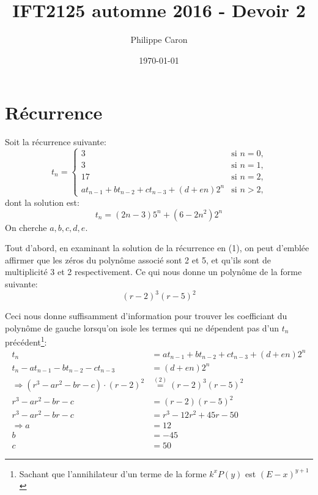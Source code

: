 \documentclass{article}
\title{\vspace{7cm}IFT2125 automne 2016 - Devoir 2} %
\author{Philippe Caron}
\date{\today}
\begin{document}
\maketitle

\pagebreak

\section{Récurrence}
Soit la récurrence suivante:
$$
t_n =
\begin{cases}
  3 & \text{si } n = 0 \text{,}\\
  3 & \text{si } n = 1 \text{,}\\
  17 & \text{si } n = 2 \text{,}\\
  at_{n-1} + bt_{n-2} + ct_{n-3} + (d + en)2^n & \text{si } n > 2 \text{,}
\end{cases}
$$
dont la solution est:
\begin{equation}
  t_n = (2n - 3)5^n + (6 - 2n^2)2^n
\end{equation}
On cherche $a, b, c, d, e$.

Tout d'abord, en examinant la solution de la récurrence en (1), on peut d'emblée affirmer que les zéros du polynôme associé sont 2 et 5, et qu'ils sont de multiplicité 3 et 2 respectivement. Ce qui nous donne un polynôme de la forme suivante:
\begin{equation}
  (r-2)^3(r-5)^2
\end{equation}

Ceci nous donne suffisamment d'information pour trouver les coefficiant du polynôme de gauche lorsqu'on isole les termes qui ne dépendent pas d'un $t_n$ précédent\footnote{Sachant que l'annihilateur d'un terme de la forme $k^xP(y)$ est $(E-x)^{y+1}$}:
\begin{align*}
  t_n &= at_{n-1} + bt_{n-2} + ct_{n-3} + (d + en)2^n\\
  t_n - at_{n-1} - bt_{n-2} - ct_{n-3} &= (d + en)2^n\\
  \Rightarrow (r^3 - ar^2 - br - c) \cdot (r-2)^2
  &\stackrel{(2)}{=} (r-2)^3(r-5)^2\\
  r^3 - ar^2 - br - c &= (r-2)(r-5)^2\\
  r^3 - ar^2 - br - c &= r^3 - 12r^2 + 45r -50\\
  \Rightarrow a &= 12\\
  b &= -45\\
  c &= 50
\end{align*}
\end{document}
